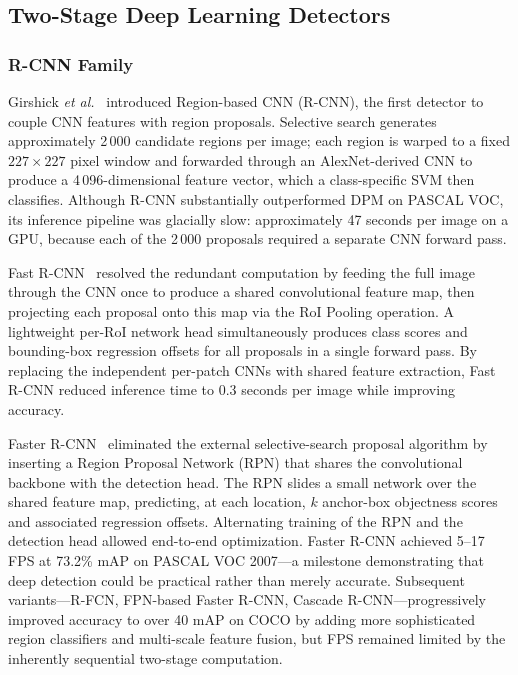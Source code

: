 
\subsection{Two-Stage Deep Learning Detectors}

\subsubsection{R-CNN Family}

Girshick \textit{et al.}~\cite{girshick2014rich} introduced
Region-based CNN (R-CNN), the first detector to couple CNN
features with region proposals.  Selective search generates
approximately 2\,000 candidate regions per image; each region
is warped to a fixed $227 \times 227$ pixel window and
forwarded through an AlexNet-derived CNN to produce a 4\,096-dimensional
feature vector, which a class-specific SVM then classifies.
Although R-CNN substantially outperformed DPM on PASCAL VOC,
its inference pipeline was glacially slow: approximately
47 seconds per image on a GPU, because each of the 2\,000
proposals required a separate CNN forward pass.

Fast R-CNN~\cite{girshick2015fast} resolved the redundant
computation by feeding the full image through the CNN once to
produce a shared convolutional feature map, then projecting
each proposal onto this map via the RoI Pooling operation.  A
lightweight per-RoI network head simultaneously produces class
scores and bounding-box regression offsets for all proposals in
a single forward pass.  By replacing the independent per-patch
CNNs with shared feature extraction, Fast R-CNN reduced
inference time to $0.3$ seconds per image while improving
accuracy.

Faster R-CNN~\cite{ren2015faster} eliminated the external
selective-search proposal algorithm by inserting a Region
Proposal Network (RPN) that shares the convolutional backbone
with the detection head.  The RPN slides a small network over
the shared feature map, predicting, at each location, $k$
anchor-box objectness scores and associated regression offsets.
Alternating training of the RPN and the detection head allowed
end-to-end optimization.  Faster R-CNN achieved 5--17 FPS
at 73.2\% mAP on PASCAL VOC 2007---a milestone demonstrating
that deep detection could be practical rather than merely
accurate.  Subsequent variants---R-FCN, FPN-based Faster
R-CNN, Cascade R-CNN---progressively improved accuracy to
over 40 mAP on COCO by adding more sophisticated region
classifiers and multi-scale feature fusion, but FPS remained
limited by the inherently sequential two-stage computation.

